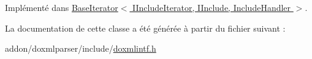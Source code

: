 Implémenté dans \hyperlink{class_base_iterator_a93b9aedc8f3aed39e3d2a0fa6d70240d}{Base\+Iterator$<$ I\+Include\+Iterator, I\+Include, Include\+Handler $>$}.



La documentation de cette classe a été générée à partir du fichier suivant \+:\begin{DoxyCompactItemize}
\item 
addon/doxmlparser/include/\hyperlink{include_2doxmlintf_8h}{doxmlintf.\+h}\end{DoxyCompactItemize}

